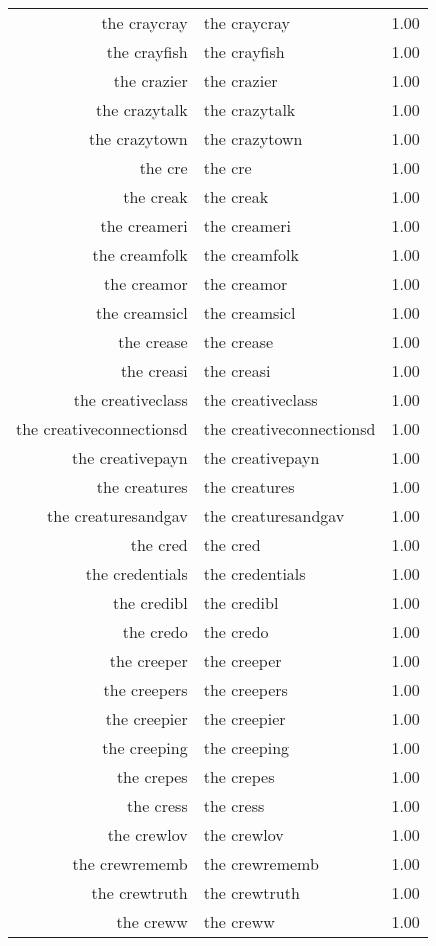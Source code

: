 \begin{table}[ht]
\begin{tabular}{rlr}
  the craycray & the craycray & 1.00 \\ 
  the crayfish & the crayfish & 1.00 \\ 
  the crazier & the crazier & 1.00 \\ 
  the crazytalk & the crazytalk & 1.00 \\ 
  the crazytown & the crazytown & 1.00 \\ 
  the cre & the cre & 1.00 \\ 
  the creak & the creak & 1.00 \\ 
  the creameri & the creameri & 1.00 \\ 
  the creamfolk & the creamfolk & 1.00 \\ 
  the creamor & the creamor & 1.00 \\ 
  the creamsicl & the creamsicl & 1.00 \\ 
  the crease & the crease & 1.00 \\ 
  the creasi & the creasi & 1.00 \\ 
  the creativeclass & the creativeclass & 1.00 \\ 
  the creativeconnectionsd & the creativeconnectionsd & 1.00 \\ 
  the creativepayn & the creativepayn & 1.00 \\ 
  the creatures & the creatures & 1.00 \\ 
  the creaturesandgav & the creaturesandgav & 1.00 \\ 
  the cred & the cred & 1.00 \\ 
  the credentials & the credentials & 1.00 \\ 
  the credibl & the credibl & 1.00 \\ 
  the credo & the credo & 1.00 \\ 
  the creeper & the creeper & 1.00 \\ 
  the creepers & the creepers & 1.00 \\ 
  the creepier & the creepier & 1.00 \\ 
  the creeping & the creeping & 1.00 \\ 
  the crepes & the crepes & 1.00 \\ 
  the cress & the cress & 1.00 \\ 
  the crewlov & the crewlov & 1.00 \\ 
  the crewrememb & the crewrememb & 1.00 \\ 
  the crewtruth & the crewtruth & 1.00 \\ 
  the creww & the creww & 1.00 \\ 

\end{tabular}
\end{table}
